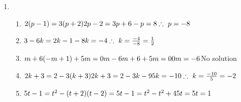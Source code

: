  \begin{solutions}{}{
\begin{enumerate}[itemsep=5pt, label=\textbf{\arabic*}. ] 

 \item 
\begin{enumerate}[itemsep=6pt,label=\textbf{(\alph*)}]
\item $2(p-1) = 3(p+2)\\
2p-2=3p+6\\
-p=8\\
\therefore~p=-8\\$
\item $3-6k = 2k-1\\
-8k=-4\\
\therefore~k=\frac{-4}{-8} =\frac{1}{2}\\$

\item $m + 6(-m+1) + 5m = 0\\
m-6m+6+5m=0\\
0m=-6\\
$No solution
\item $2k + 3 = 2-3(k+3)
2k+3=2-3k-9\\
5k=-10\\
\therefore~k=\frac{-10}{5} = -2\\$
\item $5t-1=t^{2}-(t+2)(t-2)\\ = 5t-1=t^2-t^2+4\\ 5t=5\\ t=1$


\end{enumerate}
\end{enumerate}}
\end{solutions}
